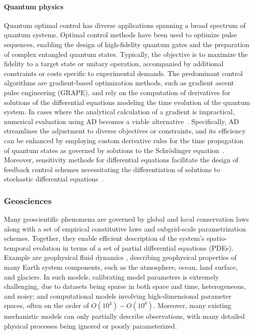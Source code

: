 \paragraph{Quantum physics}

Quantum optimal control has diverse applications spanning a broad spectrum of quantum systems. 
Optimal control methods have been used to optimize pulse sequences, enabling the design of high-fidelity quantum gates and the preparation of complex entangled quantum states. 
Typically, the objective is to maximize the fidelity to a target state or unitary operation, accompanied by additional constraints or costs specific to experimental demands. 
The predominant control algorithms are gradient-based optimization methods, such as gradient ascent pulse engineering (GRAPE), and rely on the computation of derivatives for solutions of the differential equations modeling the time evolution of the quantum system. 
In cases where the analytical calculation of a gradient is impractical, numerical evaluation using AD becomes a viable alternative~\cite{jirari:2009, leung:2017, abdelhafez:2019, jirari2019quantum, abdelhafez:2020, schaefer:2020, goerz:2022}. 
Specifically, AD streamlines the adjustment to diverse objectives or constraints, and its efficiency can be enhanced by employing custom derivative rules for the time propagation of quantum states as governed by solutions to the Schrödinger equation~\cite{goerz:2022}. 
Moreover, sensitivity methods for differential equations facilitate the design of feedback control schemes necessitating the differentiation of solutions to stochastic differential equations~\cite{schaefer:2021}.


\subsubsection{Geosciences}

Many geoscientific phenomena are governed by global and local conservation laws along with a set of empirical constitutive laws and subgrid-scale parametrization schemes. 
Together, they enable efficient description of the system's spatio-temporal evolution in terms of a set of partial differential equations (PDEs).
Example are geophysical fluid dynamics \cite{Vallis:2016kv}, describing geophysical properties of many Earth system components, such as the atmosphere, ocean, land surface, and glaciers.
In such models, calibrating model parameters is extremely challenging, due to datasets being sparse in both space and time, heterogeneous, and noisy; and computational models involving high-dimensional parameter spaces, often on the order of $O(10^3) - O(10^8)$.
Moreover, many existing mechanistic models can only partially describe observations, with many detailed physical processes being ignored or poorly parameterized. 


